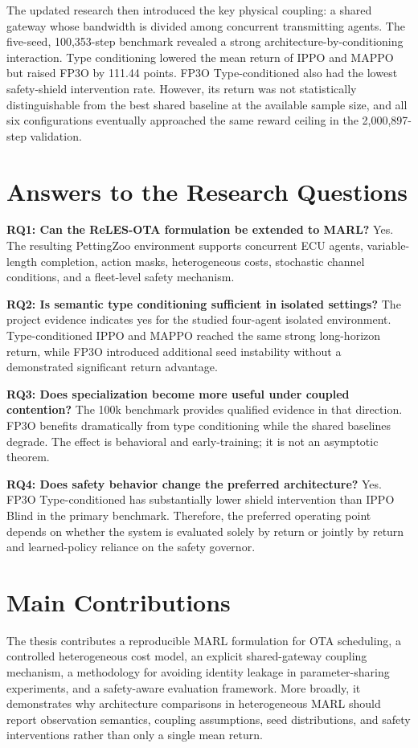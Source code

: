 \documentclass{iutbscthesis}
\begin{document}
The updated research then introduced the key physical coupling: a shared gateway whose bandwidth is divided among concurrent transmitting agents. The five-seed, 100,353-step benchmark revealed a strong architecture-by-conditioning interaction. Type conditioning lowered the mean return of IPPO and MAPPO but raised FP3O by 111.44 points. FP3O Type-conditioned also had the lowest safety-shield intervention rate. However, its return was not statistically distinguishable from the best shared baseline at the available sample size, and all six configurations eventually approached the same reward ceiling in the 2,000,897-step validation.

\section{Answers to the Research Questions}
\textbf{RQ1: Can the ReLES-OTA formulation be extended to MARL?} Yes. The resulting PettingZoo environment supports concurrent ECU agents, variable-length completion, action masks, heterogeneous costs, stochastic channel conditions, and a fleet-level safety mechanism.

\textbf{RQ2: Is semantic type conditioning sufficient in isolated settings?} The project evidence indicates yes for the studied four-agent isolated environment. Type-conditioned IPPO and MAPPO reached the same strong long-horizon return, while FP3O introduced additional seed instability without a demonstrated significant return advantage.

\textbf{RQ3: Does specialization become more useful under coupled contention?} The 100k benchmark provides qualified evidence in that direction. FP3O benefits dramatically from type conditioning while the shared baselines degrade. The effect is behavioral and early-training; it is not an asymptotic theorem.

\textbf{RQ4: Does safety behavior change the preferred architecture?} Yes. FP3O Type-conditioned has substantially lower shield intervention than IPPO Blind in the primary benchmark. Therefore, the preferred operating point depends on whether the system is evaluated solely by return or jointly by return and learned-policy reliance on the safety governor.

\section{Main Contributions}
The thesis contributes a reproducible MARL formulation for OTA scheduling, a controlled heterogeneous cost model, an explicit shared-gateway coupling mechanism, a methodology for avoiding identity leakage in parameter-sharing experiments, and a safety-aware evaluation framework. More broadly, it demonstrates why architecture comparisons in heterogeneous MARL should report observation semantics, coupling assumptions, seed distributions, and safety interventions rather than only a single mean return.
\end{document}
